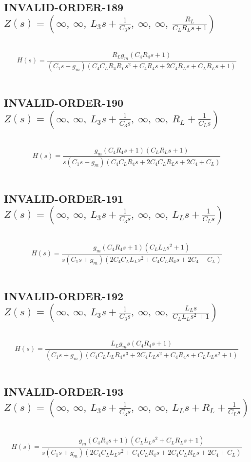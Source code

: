 \documentclass{article}
\begin{document}
\subsection{INVALID-ORDER-189 $Z(s) = \left( \infty, \  \infty, \  L_{3} s + \frac{1}{C_{3} s}, \  \infty, \  \infty, \  \frac{R_{L}}{C_{L} R_{L} s + 1}\right)$ } \ 
\textbf{\[H(s) = \frac{R_{L} g_{m} \left(C_{4} R_{4} s + 1\right)}{\left(C_{1} s + g_{m}\right) \left(C_{4} C_{L} R_{4} R_{L} s^{2} + C_{4} R_{4} s + 2 C_{4} R_{L} s + C_{L} R_{L} s + 1\right)}\] } \ 
\subsection{INVALID-ORDER-190 $Z(s) = \left( \infty, \  \infty, \  L_{3} s + \frac{1}{C_{3} s}, \  \infty, \  \infty, \  R_{L} + \frac{1}{C_{L} s}\right)$ } \ 
\textbf{\[H(s) = \frac{g_{m} \left(C_{4} R_{4} s + 1\right) \left(C_{L} R_{L} s + 1\right)}{s \left(C_{1} s + g_{m}\right) \left(C_{4} C_{L} R_{4} s + 2 C_{4} C_{L} R_{L} s + 2 C_{4} + C_{L}\right)}\] } \ 
\subsection{INVALID-ORDER-191 $Z(s) = \left( \infty, \  \infty, \  L_{3} s + \frac{1}{C_{3} s}, \  \infty, \  \infty, \  L_{L} s + \frac{1}{C_{L} s}\right)$ } \ 
\textbf{\[H(s) = \frac{g_{m} \left(C_{4} R_{4} s + 1\right) \left(C_{L} L_{L} s^{2} + 1\right)}{s \left(C_{1} s + g_{m}\right) \left(2 C_{4} C_{L} L_{L} s^{2} + C_{4} C_{L} R_{4} s + 2 C_{4} + C_{L}\right)}\] } \ 
\subsection{INVALID-ORDER-192 $Z(s) = \left( \infty, \  \infty, \  L_{3} s + \frac{1}{C_{3} s}, \  \infty, \  \infty, \  \frac{L_{L} s}{C_{L} L_{L} s^{2} + 1}\right)$ } \ 
\textbf{\[H(s) = \frac{L_{L} g_{m} s \left(C_{4} R_{4} s + 1\right)}{\left(C_{1} s + g_{m}\right) \left(C_{4} C_{L} L_{L} R_{4} s^{3} + 2 C_{4} L_{L} s^{2} + C_{4} R_{4} s + C_{L} L_{L} s^{2} + 1\right)}\] } \ 
\subsection{INVALID-ORDER-193 $Z(s) = \left( \infty, \  \infty, \  L_{3} s + \frac{1}{C_{3} s}, \  \infty, \  \infty, \  L_{L} s + R_{L} + \frac{1}{C_{L} s}\right)$ } \ 
\textbf{\[H(s) = \frac{g_{m} \left(C_{4} R_{4} s + 1\right) \left(C_{L} L_{L} s^{2} + C_{L} R_{L} s + 1\right)}{s \left(C_{1} s + g_{m}\right) \left(2 C_{4} C_{L} L_{L} s^{2} + C_{4} C_{L} R_{4} s + 2 C_{4} C_{L} R_{L} s + 2 C_{4} + C_{L}\right)}\] } \ 
\end{document}
